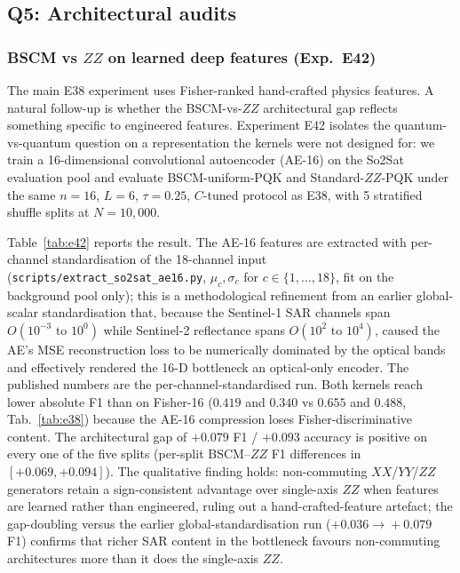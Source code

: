 \documentclass[pdflatex,sn-mathphys]{sn-jnl}
\theoremstyle{plain}
\theoremstyle{remark}
\theoremstyle{definition}
\begin{document}
\subsection{Q5: Architectural audits}\label{sec:arch-audits}

\subsubsection{BSCM vs $ZZ$ on learned deep features (Exp.\ E42)}
The main E38 experiment uses Fisher-ranked hand-crafted physics features. A natural follow-up is whether the BSCM-vs-$ZZ$ architectural gap reflects something specific to engineered features. Experiment E42 isolates the quantum-vs-quantum question on a representation the kernels were not designed for: we train a 16-dimensional convolutional autoencoder (AE-16) on the So2Sat evaluation pool and evaluate BSCM-uniform-PQK and Standard-$ZZ$-PQK under the same $n=16$, $L=6$, $\tau=0.25$, $C$-tuned protocol as E38, with 5 stratified shuffle splits at $N=10{,}000$.

Table~\ref{tab:e42} reports the result.  The AE-16 features are extracted with per-channel standardisation of the 18-channel input (\texttt{scripts/extract\_so2sat\_ae16.py}, $\mu_c, \sigma_c$ for $c\in\{1,\dots,18\}$, fit on the background pool only); this is a methodological refinement from an earlier global-scalar standardisation that, because the Sentinel-1 SAR channels span $O(10^{-3}\text{ to }10^{0})$ while Sentinel-2 reflectance spans $O(10^{2}\text{ to }10^{4})$, caused the AE's MSE reconstruction loss to be numerically dominated by the optical bands and effectively rendered the 16-D bottleneck an optical-only encoder.  The published numbers are the per-channel-standardised run.  Both kernels reach lower absolute F1 than on Fisher-16 ($0.419$ and $0.340$ vs $0.655$ and $0.488$, Tab.~\ref{tab:e38}) because the AE-16 compression loses Fisher-discriminative content.  The architectural gap of $+0.079$ F1 / $+0.093$ accuracy is positive on every one of the five splits (per-split BSCM--$ZZ$ F1 differences in $[+0.069, +0.094]$).  The qualitative finding holds: non-commuting $XX$/$YY$/$ZZ$ generators retain a sign-consistent advantage over single-axis $ZZ$ when features are learned rather than engineered, ruling out a hand-crafted-feature artefact; the gap-doubling versus the earlier global-standardisation run ($+0.036\!\to\!+0.079$ F1) confirms that richer SAR content in the bottleneck favours non-commuting architectures more than it does the single-axis $ZZ$.
\end{document}
